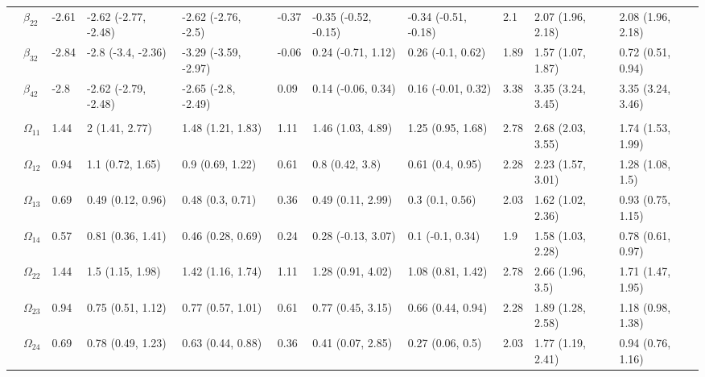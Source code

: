 \documentclass[]{article}
\begin{document}
\begin{landscape}
\begin{table}[t]
\begin{tabular}{lllllllllll}
\hspace{1em} & $\beta_{22}$ & -2.61 & -2.62 (-2.77, -2.48) & -2.62 (-2.76, -2.5) & -0.37 & -0.35 (-0.52, -0.15) & -0.34 (-0.51, -0.18) & 2.1 & 2.07 (1.96, 2.18) & 2.08 (1.96, 2.18)\\
\hspace{1em} & $\beta_{32}$ & -2.84 & -2.8 (-3.4, -2.36) & -3.29 (-3.59, -2.97) & -0.06 & 0.24 (-0.71, 1.12) & 0.26 (-0.1, 0.62) & 1.89 & 1.57 (1.07, 1.87) & 0.72 (0.51, 0.94)\\
\hspace{1em} & $\beta_{42}$ & -2.8 & -2.62 (-2.79, -2.48) & -2.65 (-2.8, -2.49) & 0.09 & 0.14 (-0.06, 0.34) & 0.16 (-0.01, 0.32) & 3.38 & 3.35 (3.24, 3.45) & 3.35 (3.24, 3.46)\\
\addlinespace[0.3em]
\multicolumn{11}{l}{\textbf{ }}\\
\hspace{1em} & $\Omega_{11}$ & 1.44 & 2 (1.41, 2.77) & 1.48 (1.21, 1.83) & 1.11 & 1.46 (1.03, 4.89) & 1.25 (0.95, 1.68) & 2.78 & 2.68 (2.03, 3.55) & 1.74 (1.53, 1.99)\\
\hspace{1em} & $\Omega_{12}$ & 0.94 & 1.1 (0.72, 1.65) & 0.9 (0.69, 1.22) & 0.61 & 0.8 (0.42, 3.8) & 0.61 (0.4, 0.95) & 2.28 & 2.23 (1.57, 3.01) & 1.28 (1.08, 1.5)\\
\hspace{1em} & $\Omega_{13}$ & 0.69 & 0.49 (0.12, 0.96) & 0.48 (0.3, 0.71) & 0.36 & 0.49 (0.11, 2.99) & 0.3 (0.1, 0.56) & 2.03 & 1.62 (1.02, 2.36) & 0.93 (0.75, 1.15)\\
\hspace{1em} & $\Omega_{14}$ & 0.57 & 0.81 (0.36, 1.41) & 0.46 (0.28, 0.69) & 0.24 & 0.28 (-0.13, 3.07) & 0.1 (-0.1, 0.34) & 1.9 & 1.58 (1.03, 2.28) & 0.78 (0.61, 0.97)\\
\hspace{1em} & $\Omega_{22}$ & 1.44 & 1.5 (1.15, 1.98) & 1.42 (1.16, 1.74) & 1.11 & 1.28 (0.91, 4.02) & 1.08 (0.81, 1.42) & 2.78 & 2.66 (1.96, 3.5) & 1.71 (1.47, 1.95)\\
\hspace{1em} & $\Omega_{23}$ & 0.94 & 0.75 (0.51, 1.12) & 0.77 (0.57, 1.01) & 0.61 & 0.77 (0.45, 3.15) & 0.66 (0.44, 0.94) & 2.28 & 1.89 (1.28, 2.58) & 1.18 (0.98, 1.38)\\
\hspace{1em} & $\Omega_{24}$ & 0.69 & 0.78 (0.49, 1.23) & 0.63 (0.44, 0.88) & 0.36 & 0.41 (0.07, 2.85) & 0.27 (0.06, 0.5) & 2.03 & 1.77 (1.19, 2.41) & 0.94 (0.76, 1.16)\\

\end{tabular}
\end{table}
\end{landscape}
\end{document}
